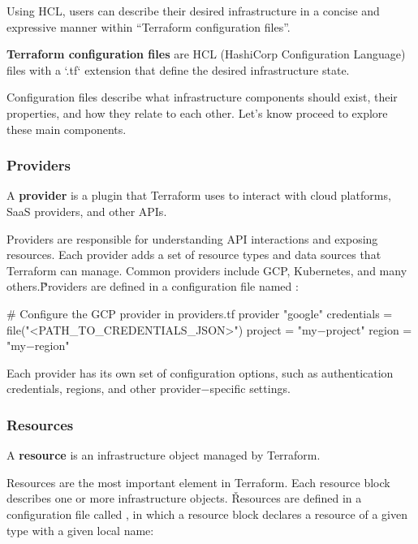 Using HCL, users can describe their desired infrastructure in a concise and expressive manner within ``Terraform
configuration files''.

\textbf{Terraform configuration files} are HCL (HashiCorp Configuration Language) files with a `.tf` extension that
define the desired infrastructure state.
\ed

Configuration files describe what infrastructure components should exist, their properties, and how they relate to each
other. Let's know proceed to explore these main components.

\subsubsection{Providers}

\bd[Provider]
A \textbf{provider} is a plugin that Terraform uses to interact with cloud platforms, SaaS providers, and other APIs.
\ed

Providers are responsible for understanding API interactions and exposing resources. Each provider adds a set of
resource types and data sources that Terraform can manage. Common providers include GCP, Kubernetes, and many others.\v

Providers are defined in a configuration file named :

\begin{block}
# Configure the GCP provider in providers.tf
provider "google" {
    credentials = file("<PATH_TO_CREDENTIALS_JSON>")
    project = "my$-$project"
    region = "my$-$region"
}
\end{block}

Each provider has its own set of configuration options, such as authentication credentials, regions, and other
provider$-$specific settings.

\subsubsection{Resources}

\bd[Resource]
A \textbf{resource} is an infrastructure object managed by Terraform.
\ed

Resources are the most important element in Terraform. Each resource block describes one or more infrastructure
objects. \v

Resources are defined in a configuration file called , in which a resource block declares a resource of a
given type with a given local name:

